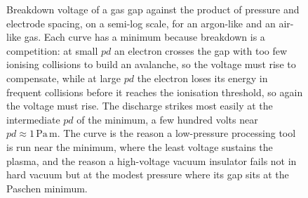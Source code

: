 \begin{figure}[htbp]
\centering
{}
\caption[Paschen breakdown curves]{Breakdown voltage of a gas gap against the
product of pressure and electrode spacing, on a semi-log scale, for an
argon-like and an air-like gas. Each curve has a minimum because breakdown is
a competition: at small $pd$ an electron crosses the gap with too few
ionising collisions to build an avalanche, so the voltage must rise to
compensate, while at large $pd$ the electron loses its energy in frequent
collisions before it reaches the ionisation threshold, so again the voltage
must rise. The discharge strikes most easily at the intermediate $pd$ of the
minimum, a few hundred volts near $pd\approx 1\,\si{\pascal}\,\si{\meter}$.
The curve is the reason a low-pressure processing tool is run near the
minimum, where the least voltage sustains the plasma, and the reason a
high-voltage vacuum insulator fails not in hard vacuum but at the modest
pressure where its gap sits at the Paschen minimum.}
\label{fig:vol04ch13:paschen}
\end{figure}

